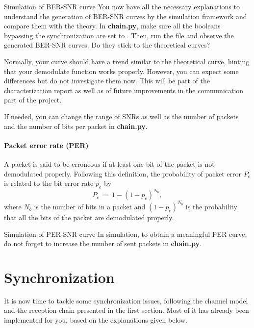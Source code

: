 \begin{bclogo}[couleur = gray!20, arrondi = 0.2, logo=\bccrayon]{Simulation of BER-SNR curve}
You now have all the necessary explanations to understand the generation of BER-SNR curves by the simulation framework and compare them with the theory. In \textbf{chain.py}, make sure all the booleans bypassing the synchronization are set to . Then, run the file and observe the generated BER-SNR curves. Do they stick to the theoretical curves?

Normally, your curve should have a trend similar to the theoretical curve, hinting that your demodulate function works properly. However, you can expect some differences but do not investigate them now. This will be part of the characterization report as well as of future improvements in the communication part of the project.

If needed, you can change the range of SNRs as well as the number of packets and the number of bits per packet in \textbf{chain.py}.
\end{bclogo}
\paragraph{Packet error rate (PER)} A packet is said to be erroneous if at least one bit of the packet is not demodulated properly. Following this definition, the probability of packet error $P_e$ is related to the bit error rate $p_e$ by
\begin{equation*}
    P_e\:=\:1- (1-p_e)^{N_b},
\end{equation*}
where $N_b$ is the number of bits in a packet and $(1-p_e)^{N_b}$ is the probability that all the bits of the packet are demodulated properly.
\begin{bclogo}[couleur = gray!20, arrondi = 0.2, logo=\bccrayon]{Simulation of PER-SNR curve}
In simulation, to obtain a meaningful PER curve, do not forget to increase the number of sent packets in \textbf{chain.py}.
\end{bclogo}



\section{Synchronization}
It is now time to tackle some synchronization issues, following the channel model and the reception chain presented in the first section. Most of it has already been implemented for you, based on the explanations given below.

